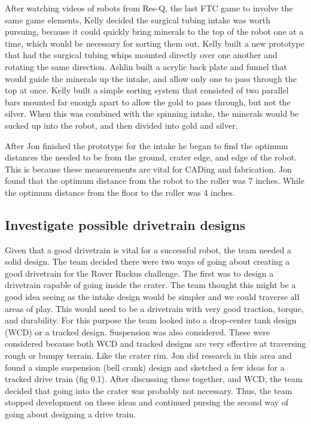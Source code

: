 \documentclass{article}
\begin{document}
After watching videos of robots from Res-Q, the last FTC game to involve the same game elements, Kelly decided the surgical tubing intake was worth pursuing, because it could quickly bring minerals to the top of the robot one at a time, which would be necessary for sorting them out. Kelly built a new prototype that had the surgical tubing whips mounted directly over one another and rotating the same direction. Ashlin built a acrylic back plate and funnel that would guide the minerals up the intake, and allow only one to pass through the top at once. Kelly built a simple sorting system that consisted of two parallel bars mounted far enough apart to allow the gold to pass through, but not the silver. When this was combined with the spinning intake, the minerals would be sucked up into the robot, and then divided into gold and silver. 

After Jon finished the prototype for the intake he began to find the optimum distances the needed to be from the ground, crater edge, and edge of the robot. This is because these measurements are vital for CADing and fabrication. Jon found that the optimum distance from the robot to the roller was 7 inches. While the optimum distance from the floor to the roller was 4 inches. 

\subsection{Investigate possible drivetrain designs}
Given that a good drivetrain is vital for a successful robot, the team needed a solid design. The team decided there were two ways of going about creating a good drivetrain for the Rover Ruckus challenge. The first was to design a drivetrain capable of going inside the crater. The team thought this might be a good idea seeing as the intake design would be simpler and we could traverse all areas of play. This would need to be a drivetrain with very good traction, torque, and durability. For this purpose the team looked into a drop-center tank design (WCD) or a tracked design. Suspension was also considered. These were considered because both WCD and tracked designs are very effective at traversing rough or bumpy terrain. Like the crater rim. Jon did research in this area and found a simple suspension (bell crank) design and sketched a few ideas for a tracked drive train (fig 0.1). After discussing these together, and WCD, the team decided that going into the crater was probably not necessary. Thus, the team stopped development on these ideas and continued pursing the second way of going about designing a drive train.
\end{document}

